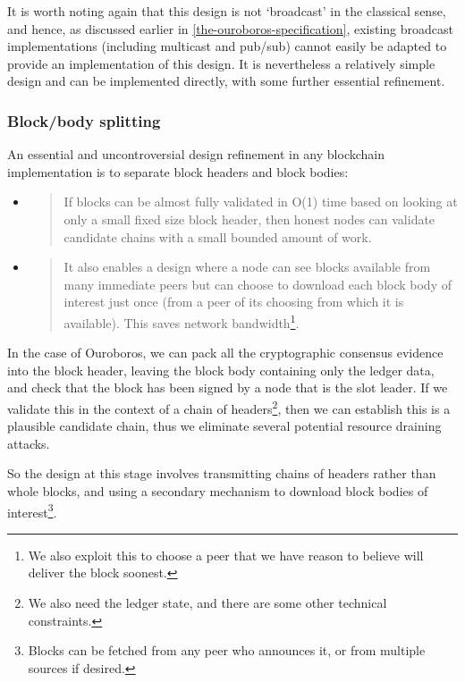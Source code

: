 \documentclass[11pt,a4paper]{article}
\begin{document}
It is worth noting again that this design is not `broadcast' in the
classical sense, and hence, as discussed earlier in
\cref{the-ouroboros-specification},
existing broadcast implementations (including multicast and pub/sub)
cannot easily be adapted to provide an implementation of this design. It
is nevertheless a relatively simple design and can be implemented
directly, with some further essential refinement.

\subsubsection{Block/body splitting}
\label{blockbody-splitting}

An essential and uncontroversial design refinement in any blockchain
implementation is to separate block headers and block bodies:

\begin{itemize}
\item
  \begin{quote}
  If blocks can be almost fully validated in O(1) time based on looking
  at only a small fixed size block header, then honest nodes can
  validate candidate chains with a small bounded amount of work.
  \end{quote}
\item
  \begin{quote}
  It also enables a design where a node can see blocks available from
  many immediate peers but can choose to download each block body of
  interest just once (from a peer of its choosing from which it is
  available). This saves network bandwidth\footnote{We also exploit this
    to choose a peer that we have reason to believe will deliver the
    block soonest.}.
  \end{quote}
\end{itemize}

In the case of Ouroboros, we can pack all the cryptographic consensus
evidence into the block header, leaving the block body containing only
the ledger data, and check that the block has been signed by a node that
is the slot leader. If we validate this in the context of a chain of
headers\footnote{We also need the ledger state, and there are some other
  technical constraints.}, then we can establish this is a plausible
candidate chain, thus we eliminate several potential resource draining
attacks.

So the design at this stage involves transmitting chains of headers
rather than whole blocks, and using a secondary mechanism to download
block bodies of interest\footnote{Blocks can be fetched from any peer
  who announces it, or from multiple sources if desired.}.
\end{document}
